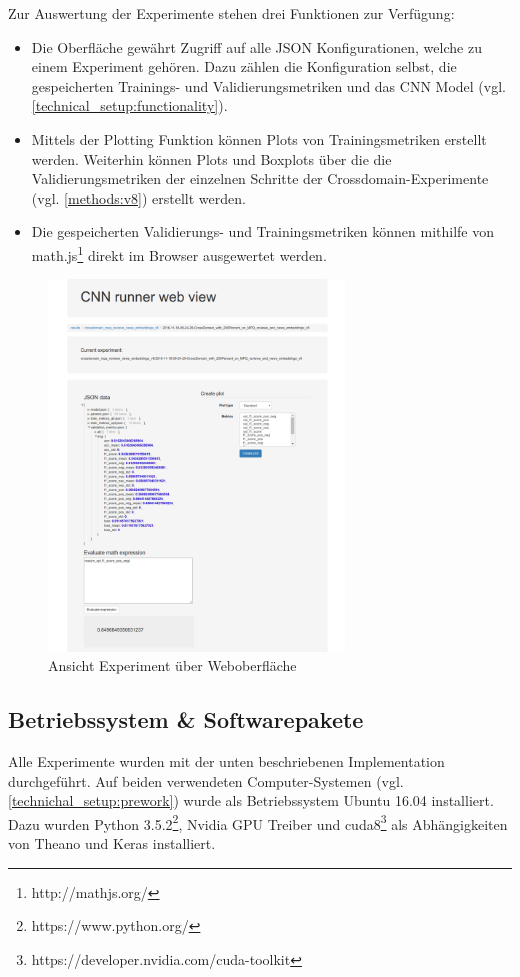 Zur Auswertung der Experimente stehen drei Funktionen zur Verfügung:
\begin{itemize}
	\item Die Oberfläche gewährt Zugriff auf alle JSON Konfigurationen, welche zu einem Experiment gehören. Dazu zählen die Konfiguration selbst, die gespeicherten Trainings- und Validierungsmetriken und das CNN Model (vgl. \ref{technical_setup:functionality}).
	\item Mittels der Plotting Funktion können Plots von Trainingsmetriken erstellt werden. Weiterhin können Plots und Boxplots über die die Validierungsmetriken der einzelnen Schritte der Crossdomain-Experimente (vgl. \ref{methods:v8}) erstellt werden.
	\item Die gespeicherten Validierungs- und Trainingsmetriken können mithilfe von math.js\footnote{http://mathjs.org/} direkt im Browser ausgewertet werden.
\end{itemize}
\begin{figure}[htbp]
	\centering
	\includegraphics[width=0.7\textwidth]{img/web_gui}
	\caption{Ansicht Experiment über Weboberfläche}
	\label{fig:web_gui}
\end{figure}
\subsection{Betriebssystem \& Softwarepakete}
\label{technical_setup:software}
Alle Experimente wurden mit der unten beschriebenen Implementation durchgeführt. Auf beiden verwendeten Computer-Systemen (vgl. \ref{technichal_setup:prework}) wurde als Betriebssystem Ubuntu 16.04 installiert. Dazu wurden Python 3.5.2\footnote{https://www.python.org/}, Nvidia GPU Treiber und cuda8\footnote{https://developer.nvidia.com/cuda-toolkit} als Abhängigkeiten von Theano und Keras installiert.

